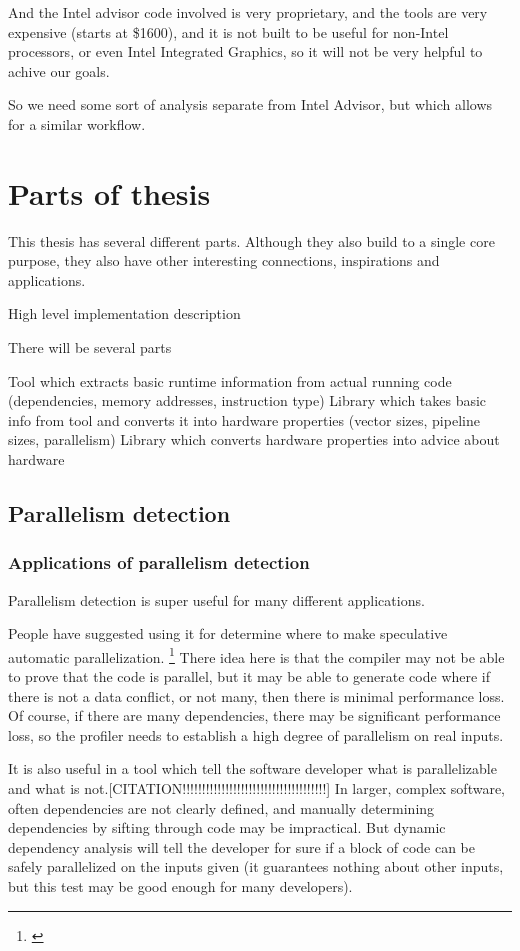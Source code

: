 \documentclass[12pt,twoside]{reedthesis}
\begin{document}
		And the Intel advisor code involved is very proprietary, and the tools are very expensive (starts at \$1600), and it is not built to be useful for non-Intel processors, or even Intel Integrated Graphics, so it will not be very helpful to achive our goals.

		So we need some sort of analysis separate from Intel Advisor, but which allows for a similar workflow.

	\section{Parts of thesis}

		This thesis has several different parts. Although they also build to a single core purpose, they also have other interesting connections, inspirations and applications.


		High level implementation description

		There will be several parts

		Tool which extracts basic runtime information from actual running code (dependencies, memory addresses, instruction type)
		Library which takes basic info from tool and converts it into hardware properties (vector sizes, pipeline sizes, parallelism)
		Library which converts hardware properties into advice about hardware


	\subsection{Parallelism detection}

		\subsubsection{Applications of parallelism detection}

		Parallelism detection is super useful for many different applications.

		People have suggested using it for determine where to make speculative automatic parallelization. \footnote{\cite{Chen:2004}} There idea here is that the compiler may not be able to prove that the code is parallel, but it may be able to generate code where if there is not a data conflict, or not many, then there is minimal performance loss. Of course, if there are many dependencies, there may be significant performance loss, so the profiler needs to establish a high degree of parallelism on real inputs.

		It is also useful in a tool which tell the software developer what is parallelizable and what is not.[CITATION!!!!!!!!!!!!!!!!!!!!!!!!!!!!!!!!!!!!!]
		In larger, complex software, often dependencies are not clearly defined, and manually determining dependencies by sifting through code may be impractical. But dynamic dependency analysis will tell the developer for sure if a block of code can be safely parallelized on the inputs given (it guarantees nothing about other inputs, but this test may be good enough for many developers).
\end{document}

